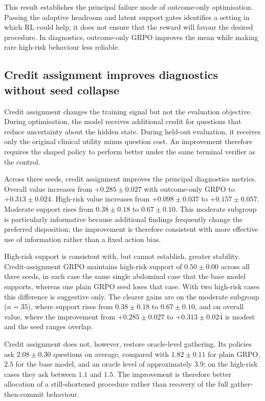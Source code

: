 \documentclass{article}
\begin{document}
This result establishes the principal failure mode of outcome-only optimisation.
Passing the adaptive headroom and latent support gates identifies a setting in
which RL could help; it does not ensure that the reward will favour the desired
procedure. In diagnostics, outcome-only GRPO improves the mean while making rare
high-risk behaviour less reliable.


\subsection{Credit assignment improves diagnostics without seed collapse}
\label{subsec:credit-diagnostics}

Credit assignment changes the training signal but not the evaluation objective.
During optimisation, the model receives additional credit for questions that
reduce uncertainty about the hidden state. During held-out evaluation, it receives
only the original clinical utility minus question cost. An improvement therefore
requires the shaped policy to perform better under the same terminal verifier as
the control.

Across three seeds, credit assignment improves the principal diagnostics metrics.
Overall value increases from $+0.285\pm0.027$ with outcome-only GRPO to
$+0.313\pm0.024$. High-risk value increases from $+0.098\pm0.037$ to
$+0.157\pm0.057$. Moderate support rises from $0.38\pm0.18$ to
$0.67\pm0.10$. This moderate subgroup is particularly informative because
additional findings frequently change the preferred disposition; the improvement
is therefore consistent with more effective use of information rather than a
fixed action bias.

High-risk support is consistent with, but cannot establish, greater stability.
Credit-assignment GRPO maintains high-risk support of $0.50{\pm}0.00$ across all
three seeds, in each case the same single abdominal case that the base model
supports, whereas one plain GRPO seed loses that case. With two high-risk cases this
difference is suggestive only. The clearer gains are on the moderate subgroup
($n{=}35$), where support rises from $0.38{\pm}0.18$ to $0.67{\pm}0.10$, and on
overall value, where the improvement from $+0.285{\pm}0.027$ to $+0.313{\pm}0.024$
is modest and the seed ranges overlap.

Credit assignment does not, however, restore oracle-level gathering. Its policies ask
$2.08{\pm}0.30$ questions on average, compared with $1.82{\pm}0.11$ for plain GRPO,
$2.5$ for the base model, and an oracle level of approximately $3.9$; on the
high-risk cases they ask between $1.1$ and $1.5$. The improvement is therefore better
allocation of a still-shortened procedure rather than recovery of the full
gather-then-commit behaviour.
\end{document}
